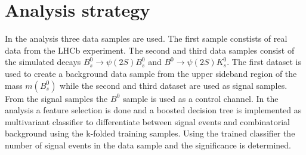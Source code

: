 \section{Analysis strategy}
\label{sec:Durchführung}
In the analysis three data samples are used. The first sample constists of real data from the LHCb experiment. The second and third data samples consist of 
the simulated decays $B_s^0 \rightarrow \psi(2S) B_s^0$ and $B^0 \rightarrow \psi(2S) K_s^0$. The first dataset is used to create a 
background data sample from the upper sideband region of the mass $m(B_s^0)$ while the second and third dataset are used as signal samples.
From the signal samples the $B^0$ sample is used as a control channel. 
In the analysis a feature selection is done and a boosted decision tree is implemented as multivariant classifier  
to differentiate between signal events and combinatorial background using the k-folded training samples. 
Using the trained classifier the number of signal events in the data sample and the significance is determined.
